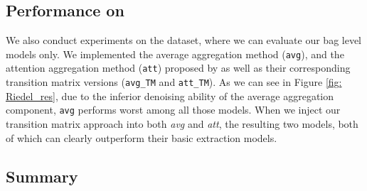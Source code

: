 \subsection{Performance on \EntityRE}
We also conduct experiments on the \EntityRE dataset, where we can evaluate our bag level models only.  
We  implemented the average aggregation method (\texttt{avg}), and the attention aggregation method (\texttt{att}) proposed by \cite{lin2016neural} as well as their corresponding transition matrix versions (\texttt{avg\_TM} and \texttt{att\_TM}). As we can see in Figure \ref{fig: Riedel_res},  due to the inferior denoising ability of the average aggregation component, \texttt{avg} performs worst among all those models. %
When we inject our transition matrix approach into both \emph{avg} and \emph{att}, the resulting two  models, both of which can  clearly outperform their basic extraction models.
%

\subsection{Summary}
